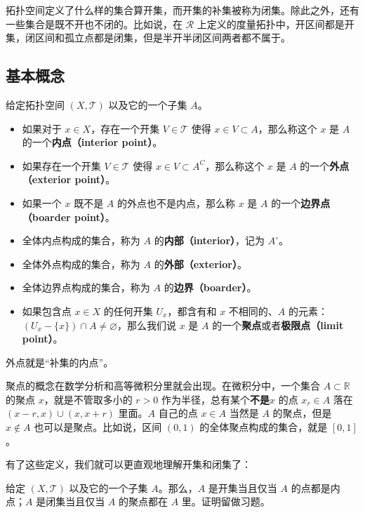
拓扑空间定义了什么样的集合算开集，而开集的补集被称为闭集。除此之外，还有一些集合是既不开也不闭的。比如说，在 $\mathcal{R}$ 上定义的度量拓扑中，开区间都是开集，闭区间和孤立点都是闭集，但是半开半闭区间两者都不属于。

\subsection{基本概念}
\begin{definition}{}\label{def_Topo0_1}
给定拓扑空间 $(X, \mathcal{T})$ 以及它的一个子集 $A$。
\begin{itemize}
\item 如果对于 $x\in X$，存在一个开集 $V\in \mathcal{T}$ 使得 $x\in V\subset A$，那么称这个 $x$ 是 $A$ 的一个\textbf{内点（interior point）}。
\item 如果存在一个开集 $V\in \mathcal{T}$ 使得 $x\in V\subset A^C$，那么称这个 $x$ 是 $A$ 的一个\textbf{外点（exterior point）}。
\item 如果一个 $x$ 既不是 $A$ 的外点也不是内点，那么称 $x$ 是 $A$ 的一个\textbf{边界点（boarder point）}。

\item 全体内点构成的集合，称为 $A$ 的\textbf{内部（interior）}，记为 $A^\circ$。
\item 全体外点构成的集合，称为 $A$ 的\textbf{外部（exterior）}。
\item 全体边界点构成的集合，称为 $A$ 的\textbf{边界（boarder）}。
\item 如果包含点 $x\in X$ 的任何开集 $U_x$，都含有和 $x$ 不相同的、$A$ 的元素：$(U_x-\{x\})\cap A\not=\varnothing$，那么我们说 $x$ 是 $A$ 的一个\textbf{聚点}或者\textbf{极限点（limit point）}。
\end{itemize}
\end{definition}

外点就是“补集的内点”。

聚点的概念在数学分析和高等微积分里就会出现。在微积分中，一个集合 $A\subset\mathbb{R}$ 的聚点 $x$，就是不管取多小的 $r>0$ 作为半径，总有某个\textbf{不是}$x$ 的点 $x_r\in A$ 落在 $(x-r, x)\cup(x, x+r)$ 里面。$A$ 自己的点 $x\in A$ 当然是 $A$ 的聚点，但是 $x\not\in A$ 也可以是聚点。比如说，区间 $(0,1)$ 的全体聚点构成的集合，就是 $[0,1]$。

有了这些定义，我们就可以更直观地理解开集和闭集了：

\begin{exercise}{}\label{exe_Topo0_1}
给定 $(X, \mathcal{T})$ 以及它的一个子集 $A$。那么，$A$ 是开集当且仅当 $A$ 的点都是内点；$A$ 是闭集当且仅当 $A$ 的聚点都在 $A$ 里。证明留做习题。
\end{exercise}

